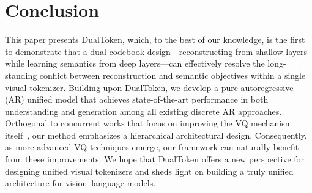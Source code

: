 \section{Conclusion}
\label{sec:conclusion}

This paper presents DualToken, which, to the best of our knowledge, is the first to demonstrate that a dual-codebook design---reconstructing from shallow layers while learning semantics from deep layers---can effectively resolve the long-standing conflict between reconstruction and semantic objectives within a single visual tokenizer.
Building upon DualToken, we develop a pure autoregressive (AR) unified model that achieves state-of-the-art performance in both understanding and generation among all existing discrete AR approaches.
Orthogonal to concurrent works that focus on improving the VQ mechanism itself~\citep{unitok}, our method emphasizes a hierarchical architectural design. Consequently, as more advanced VQ techniques emerge, our framework can naturally benefit from these improvements.
We hope that DualToken offers a new perspective for designing unified visual tokenizers and sheds light on building a truly unified architecture for vision–language models.
